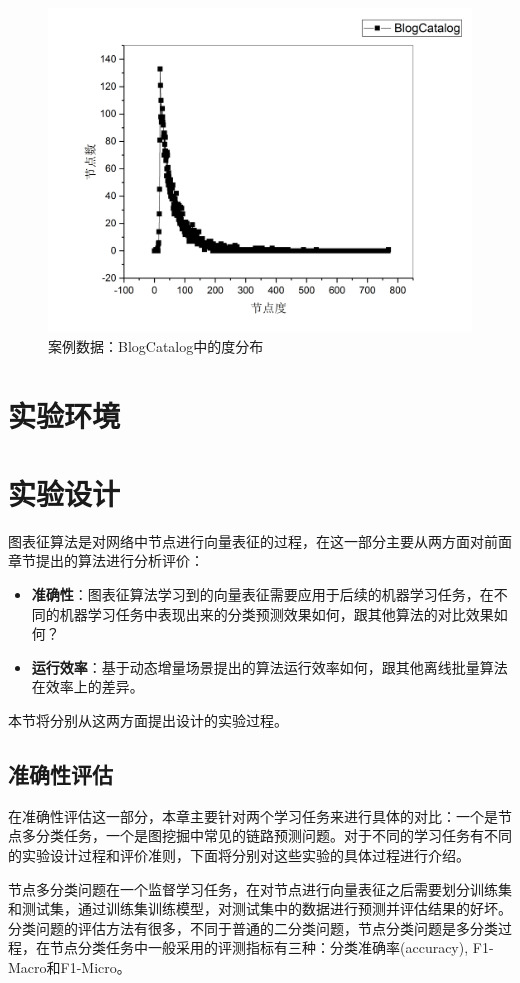 \begin{figure}
	\centering
	\includegraphics[width=5in]{figures/blogCatalog_degree}
	\caption{案例数据：BlogCatalog中的度分布}
\end{figure}
\section{实验环境}

\section{实验设计}
图表征算法是对网络中节点进行向量表征的过程，在这一部分主要从两方面对前面章节提出的算法进行分析评价：
\begin{itemize}
	\item \textbf{准确性}：图表征算法学习到的向量表征需要应用于后续的机器学习任务，在不同的机器学习任务中表现出来的分类预测效果如何，跟其他算法的对比效果如何？
	\item \textbf{运行效率}：基于动态增量场景提出的算法运行效率如何，跟其他离线批量算法在效率上的差异。
\end{itemize}
本节将分别从这两方面提出设计的实验过程。
\subsection{准确性评估}
在准确性评估这一部分，本章主要针对两个学习任务来进行具体的对比：一个是节点多分类任务，一个是图挖掘中常见的链路预测问题。对于不同的学习任务有不同的实验设计过程和评价准则，下面将分别对这些实验的具体过程进行介绍。

节点多分类问题在一个监督学习任务，在对节点进行向量表征之后需要划分训练集和测试集，通过训练集训练模型，对测试集中的数据进行预测并评估结果的好坏。分类问题的评估方法有很多，不同于普通的二分类问题，节点分类问题是多分类过程，在节点分类任务中一般采用的评测指标有三种：分类准确率(accuracy), F1-Macro和F1-Micro。

